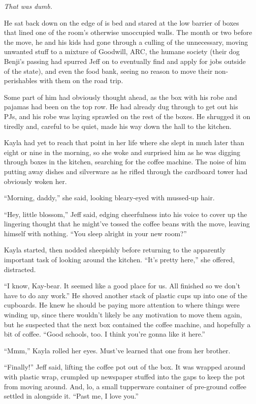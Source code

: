 \textit{That was dumb.}

He sat back down on the edge of is bed and stared at the low barrier of boxes that lined one of the room's otherwise unoccupied walls.  The month or two before the move, he and his kids had gone through a culling of the unnecessary, moving unwanted stuff to a mixture of Goodwill, ARC, the humane society (their dog Benji's passing had spurred Jeff on to eventually find and apply for jobs outside of the state), and even the food bank, seeing no reason to move their non-perishables with them on the road trip.

Some part of him had obviously thought ahead, as the box with his robe and pajamas had been on the top row.  He had already dug through to get out his PJs, and his robe was laying sprawled on the rest of the boxes.  He shrugged it on tiredly and, careful to be quiet, made his way down the hall to the kitchen.

Kayla had yet to reach that point in her life where she slept in much later than eight or nine in the morning, so she woke and surprised him as he was digging through boxes in the kitchen, searching for the coffee machine.  The noise of him putting away dishes and silverware as he rifled through the cardboard tower had obviously woken her.

``Morning, daddy,'' she said, looking bleary-eyed with mussed-up hair.

``Hey, little blossom,'' Jeff said, edging cheerfulness into his voice to cover up the lingering thought that he might've tossed the coffee beans with the move, leaving himself with nothing.  ``You sleep alright in your new room?''

Kayla started, then nodded sheepishly before returning to the apparently important task of looking around the kitchen.  ``It's pretty here,'' she offered, distracted.

``I know, Kay-bear.  It seemed like a good place for us.  All finished so we don't have to do any work.''  He shoved another stack of plastic cups up into one of the cupboards.  He knew he should be paying more attention to where things were winding up, since there wouldn't likely be any motivation to move them again, but he suspected that the next box contained the coffee machine, and hopefully a bit of coffee.  ``Good schools, too.  I think you're gonna like it here.''

``Mmm,'' Kayla rolled her eyes.  Must've learned that one from her brother.

``Finally!'' Jeff said, lifting the coffee pot out of the box.  It was wrapped around with plastic wrap, crumpled up newspaper stuffed into the gaps to keep the pot from moving around.  And, lo, a small tupperware container of pre-ground coffee settled in alongside it.  ``Past me, I love you.''

